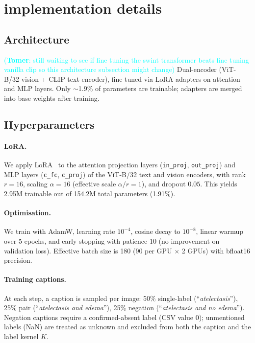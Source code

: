 \documentclass[10pt,twocolumn,letterpaper]{article}
\newcommand\te[1]{\textcolor{cyan}{(\textbf{Tomer}: #1)}}
\begin{document}
\section{implementation details}

\subsection{Architecture}
\te{still waiting to see if fine tuning the swint transformer beats fine tuning vanilla clip so this architecture subsection might change}
Dual-encoder (ViT-B/32 vision + CLIP text encoder), fine-tuned via LoRA adapters on
attention and MLP layers. Only $\sim$1.9\% of parameters are trainable; adapters are
merged into base weights after training.

\subsection{Hyperparameters}
\paragraph{LoRA.}
We apply LoRA~\cite{hu2022lora} to the attention projection layers (\texttt{in\_proj}, \texttt{out\_proj}) and MLP layers (\texttt{c\_fc}, \texttt{c\_proj}) of the ViT-B/32 text and vision encoders, with rank $r{=}16$, scaling $\alpha{=}16$ (effective scale $\alpha/r = 1$), and dropout $0.05$. This yields 2.95M trainable out of 154.2M total parameters (1.91\%).

\paragraph{Optimisation.}
We train with AdamW, learning rate $10^{-4}$, cosine decay to $10^{-8}$, linear warmup over 5 epochs, and early stopping with patience 10 (no improvement on validation loss). Effective batch size is 180 (90 per GPU $\times$ 2 GPUs) with bfloat16 precision.

\paragraph{Training captions.}
At each step, a caption is sampled per image: 50\% single-label (``\textit{atelectasis}''), 25\% pair (``\textit{atelectasis and edema}''), 25\% negation (``\textit{atelectasis and no edema}''). Negation captions require a confirmed-absent label (CSV value 0); unmentioned labels (NaN) are treated as unknown and excluded from both the caption and the label kernel $K$.
\end{document}
